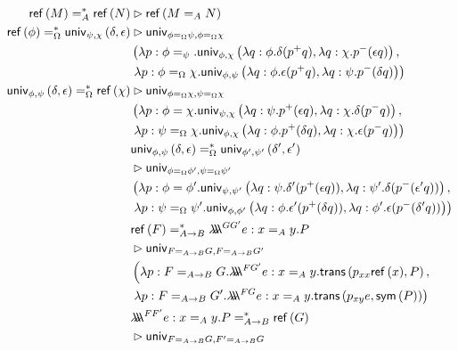 \begin{align*}
\reff{M} =^*_A \reff{N} & \rhd \reff{M =_A N} \\
\reff{\phi} =^*_\Omega \univ{\psi}{\chi}{\delta}{\epsilon} & \rhd 
  \mathsf{univ}_{\phi =_\Omega \psi,\phi =_\Omega \chi} \\
&  \left( \lambda p:\phi =_\psi. \univ{\phi}{\chi}{\lambda q:\phi.\delta (p^+ q)}
    {\lambda q : \chi. p^- (\epsilon q)}, \right. \\
& 
  \left. \lambda p:\phi =_\Omega \chi. \univ{\phi}{\psi}{\lambda q:\phi. \epsilon (p^+ q)}
    {\lambda q : \psi. p^- (\delta q)} \right) \\
 \univ{\phi}{\psi}{\delta}{\epsilon} =^*_\Omega \reff{\chi} & \rhd
  \mathsf{univ}_{\phi =_\Omega \chi, \psi =_\Omega \chi} \\
&    \left( \lambda p:\phi = \chi . \univ{\psi}{\chi}{\lambda q:\psi. p^+ (\epsilon q)}
      {\lambda q:\chi. \delta (p^- q)}, \right. \\
&    \left. \lambda p:\psi =_\Omega \chi. \univ{\phi}{\chi}{\lambda q:\phi. p^+ (\delta q)}
      {\lambda q:\chi. \epsilon (p^- q)} \right) \\
\lefteqn{\univ{\phi}{\psi}{\delta}{\epsilon} =^*_\Omega \univ{\phi'}{\psi'}{\delta'}{\epsilon'}} \\
& \rhd
\mathsf{univ}_{\phi =_\Omega \phi', \psi =_\Omega \psi'} \\
& \left( \lambda p:\phi = \phi'. \univ{\psi}{\psi'}{\lambda q:\psi. \delta' (p^+ (\epsilon q))}{\lambda q:\psi' . \delta (p^-(\epsilon' q))}, \right. \\
& \left. \lambda p:\psi=_\Omega \psi' . \univ{\phi}{\phi'}{\lambda q:\phi. \epsilon' (p^+ (\delta q))}{\lambda q:\phi' . \epsilon (p^- (\delta' q))} \right) \\
\lefteqn{\reff{F} =^*_{A \rightarrow B} \triplelambda^{G G'} e:x =_A y. P} \\
& \rhd
\mathsf{univ}_{F =_{A \rightarrow B} G, F =_{A \rightarrow B} G'} \\
& \left( \lambda p : F =_{A \rightarrow B} G. \triplelambda^{F G'} e : x =_A y. 
\trans{p_{xx} \reff{x}}{P}, \right. \\
& \left. \lambda p : F =_{A \rightarrow B} G'. \triplelambda^{F G} e : x =_A y.
\trans{p_{xy} e}{\sym{P}} \right) \\
\lefteqn{\triplelambda^{F F'} e : x =_A y. P =^*_{A \rightarrow B} \reff{G}} \\
 & \rhd
\mathsf{univ}_{F =_{A \rightarrow B} G,F' =_{A \rightarrow B} G} \\

\end{align*}

